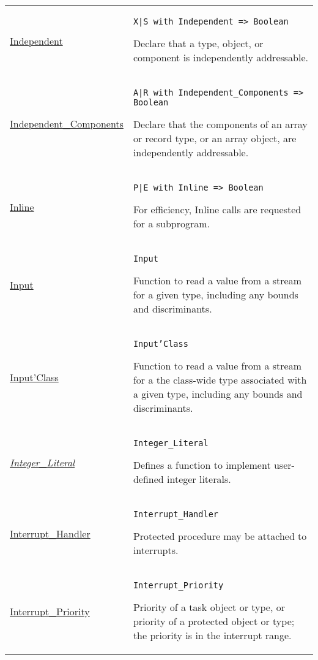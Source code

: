 \documentclass[english]{article}
\begin{document}
\begin{scriptsize}
\begin{multicols*}{3}
\begin{tabular}{@{}p{2cm}p{6.5cm}}
   \href{http://www.ada-auth.org/standards/22rm/html/RM-C-6.html}{Independent} & \texttt{X|S with Independent => Boolean}

   Declare that a type, object, or component is independently addressable.\\

   \href{http://www.ada-auth.org/standards/22rm/html/RM-C-6.html}{Independent\_Components} & \texttt{A|R with Independent\_Components => Boolean}

   Declare that the components of an array or record type, or an array object, are independently addressable.\\

   \href{http://www.ada-auth.org/standards/22rm/html/RM-6-3-2.html}{Inline} & \texttt{P|E with Inline => Boolean}

   For efficiency, Inline calls are requested for a subprogram.\\

   \href{http://www.ada-auth.org/standards/22rm/html/RM-13-13-2.html}{Input} & \texttt{Input}

   Function to read a value from a stream for a given type, including any bounds and discriminants.\\

   \href{http://www.ada-auth.org/standards/22rm/html/RM-13-13-2.html}{Input'Class} & \texttt{Input'Class}

   Function to read a value from a stream for a the class-wide type associated with a given type, including any bounds and discriminants.\\

   \href{http://www.ada-auth.org/standards/22rm/html/RM-4-2-1.html}{\textit{Integer\_Literal}} & \texttt{Integer\_Literal}

   Defines a function to implement user-defined integer literals.\\

   \href{http://www.ada-auth.org/standards/22rm/html/RM-C-3-1.html}{Interrupt\_Handler} & \texttt{Interrupt\_Handler}

   Protected procedure may be attached to interrupts.\\

   \href{http://www.ada-auth.org/standards/22rm/html/RM-D-1.html}{Interrupt\_Priority} & \texttt{Interrupt\_Priority}

   Priority of a task object or type, or priority of a protected object or type; the priority is in the interrupt range.\\


\end{tabular}
\end{multicols*}
\end{scriptsize}
\end{document}
